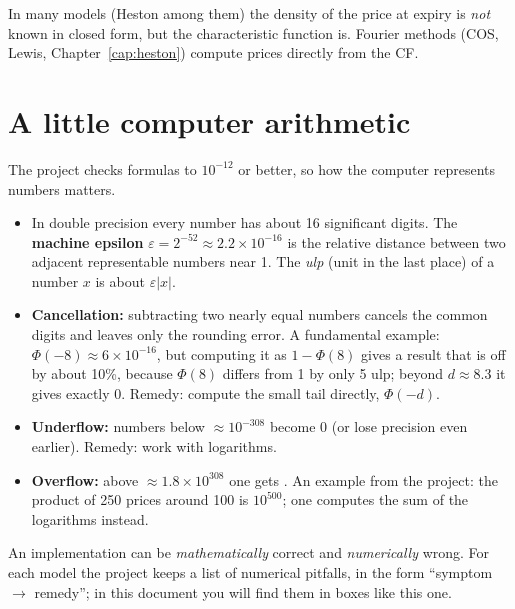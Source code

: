 \begin{idea}
In many models (Heston among them) the density of the price at expiry is \emph{not} known in closed form, but the
characteristic function is. Fourier methods (COS, Lewis, Chapter~\ref{cap:heston}) compute prices directly from the
CF.
\end{idea}

\section{A little computer arithmetic}
The project checks formulas to $10^{-12}$ or better, so how the computer represents numbers matters.
\begin{itemize}
\item In double precision every number has about 16 significant digits. The \textbf{machine epsilon}
$\varepsilon=2^{-52}\approx{2.2\times10^{-16}}$ is the relative distance between two adjacent representable numbers
near 1. The \emph{ulp} (unit in the last place) of a number $x$ is about $\varepsilon|x|$.
\item \textbf{Cancellation:} subtracting two nearly equal numbers cancels the common digits and leaves only the
rounding error. A fundamental example: $\Phi(-8)\approx{6\times10^{-16}}$, but computing it as $1-\Phi(8)$ gives a
result that is off by about 10\%, because $\Phi(8)$ differs from 1 by only 5 ulp; beyond $d\approx8.3$ it gives
exactly 0. Remedy: compute the small tail directly, $\Phi(-d)$.
\item \textbf{Underflow:} numbers below $\approx10^{-308}$ become 0 (or lose precision even earlier). Remedy: work with
logarithms.
\item \textbf{Overflow:} above $\approx{1.8\times10^{308}}$ one gets . An example from the project: the
product of 250 prices around 100 is $10^{500}$; one computes the sum of the logarithms instead.
\end{itemize}

\begin{attenzione}
An implementation can be \emph{mathematically} correct and \emph{numerically} wrong. For each model the project
keeps a list of numerical pitfalls, in the form ``symptom $\to$ remedy''; in this document you will find them in
boxes like this one.
\end{attenzione}

